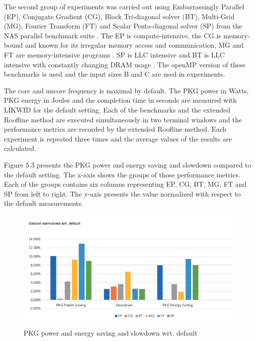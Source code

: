 The second group of experiments was carried out using Embarrassingly Parallel (EP),  Conjugate Gradient (CG),  Block Tri-diagonal solver (BT), Multi-Grid (MG), Fourier Transform (FT) and Scalar Penta-diagonal solver (SP) from the NAS parallel benchmark suite \cite{23}. The EP is compute-intensive, the CG is memory-bound and known for its irregular memory access and communication, MG and FT are memory-intensive programs \cite{23}. SP is LLC intensive and BT is LLC intensive with constantly changing DRAM usage \cite{21}. The openMP version of these benchmarks is used and the input sizes B and C are used in experiments.

The core and uncore frequency is maximal by default. The PKG power in Watts, PKG energy in Joules and the completion time in seconds are measured with LIKWID for the default setting. Each of the benchmarks and the extended Roofline method are executed simultaneously in two terminal windows and the performance metrics are recorded by the extended Roofline method. Each experiment is repeated three times and the average values of the results are calculated. 

Figure 5.3 presents the PKG power and energy saving and slowdown compared to the default setting. The x-axis shows the groups of those performance metrics. Each of the groups contains six columns representing EP, CG, BT, MG, FT and SP from left to right. The y-axis presents the value normalized with respect to the default measurements.

\begin{figure} [h] %
	\centering   %
	\includegraphics[width=17cm]{pictures/NPB}
	\caption{PKG power and energy saving and slowdown wrt. default}
\end{figure}


